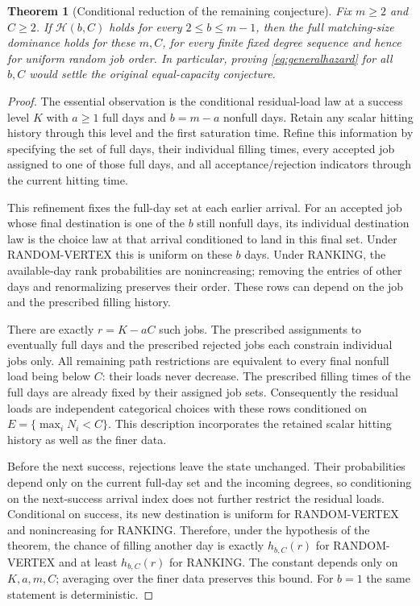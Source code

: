 \documentclass[11pt]{article}
\newtheorem{theorem}{Theorem}
\begin{document}
\begin{theorem}[Conditional reduction of the remaining conjecture]\label{thm:hazardreduction}
Fix $m\geq2$ and $C\geq2$. If $\mathcal H(b,C)$ holds for every
$2\leq b\leq m-1$, then the full matching-size dominance holds for
these $m,C$, for every finite fixed degree sequence and hence for
uniform random job order. In particular, proving
\eqref{eq:generalhazard} for all $b,C$ would settle the original
equal-capacity conjecture.
\end{theorem}
\begin{proof}
The essential observation is the conditional residual-load law at
a success level $K$ with $a\geq1$ full days and $b=m-a$ nonfull
days. Retain any scalar hitting history through this level and the
first saturation time. Refine this information by specifying the set
of full days, their individual filling times, every accepted job
assigned to one of those full days, and all acceptance/rejection
indicators through the current hitting time.

This refinement fixes the full-day set at each earlier arrival.
For an accepted job whose final destination is one of the $b$ still
nonfull days, its individual destination law is the choice law at
that arrival conditioned to land in this final set. Under
RANDOM-VERTEX this is uniform on these $b$ days. Under RANKING,
the available-day rank probabilities are nonincreasing; removing
the entries of other days and renormalizing preserves their order.
These rows can depend on the job and the prescribed filling history.

There are exactly $r=K-aC$ such jobs. The prescribed assignments to
eventually full days and the prescribed rejected jobs each constrain
individual jobs only. All remaining path restrictions are equivalent
to every final nonfull load being below $C$: their loads never
decrease. The prescribed filling times of the full days are already
fixed by their assigned job sets. Consequently the residual loads
are independent categorical choices with these rows conditioned on
$E=\{\max_iN_i<C\}$. This description incorporates the retained
scalar hitting history as well as the finer data.

Before the next success, rejections leave the state unchanged. Their
probabilities depend only on the current full-day set and the incoming
degrees, so conditioning on the next-success arrival index does not
further restrict the residual loads. Conditional on success, its new
destination is uniform for RANDOM-VERTEX and nonincreasing for RANKING.
Therefore, under the hypothesis of the theorem, the chance of filling
another day is exactly $h_{b,C}(r)$ for RANDOM-VERTEX and at least
$h_{b,C}(r)$ for RANKING. The constant depends only on $K,a,m,C$;
averaging over the finer data preserves this bound. For $b=1$ the same
statement is deterministic.


\end{proof}
\end{document}
